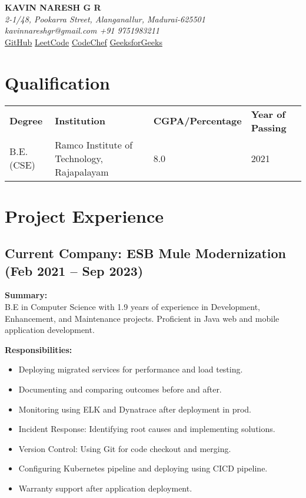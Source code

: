 \documentclass[letterpaper,10pt]{article}
\begin{document}
\pagestyle{empty} %

\begin{center}
\textbf{\LARGE KAVIN NARESH G R} \\
\textit{2-1/48, Pookarra Street, Alanganallur, Madurai-625501} \\
\textit{kavinnareshgr@gmail.com \quad +91 9751983211} \\
\href{https://github.com/kavin-naresh}{GitHub} \quad \href{https://leetcode.com/kavinnareshgr/}{LeetCode} \quad \href{https://www.codechef.com/users/kavinnaresh/}{CodeChef} \quad \href{https://auth.geeksforgeeks.org/user/kavinnan6sj}{GeeksforGeeks}
\end{center}

\section*{Qualification}
\begin{tabular}{l l l l}
\textbf{Degree} & \textbf{Institution} & \textbf{CGPA/Percentage} & \textbf{Year of Passing} \\
B.E.(CSE) & Ramco Institute of Technology, Rajapalayam & 8.0 & 2021 \\
\end{tabular}

\section*{Project Experience}

\subsection*{Current Company: ESB Mule Modernization (Feb 2021 -- Sep 2023)}
\textbf{Summary:} \\
B.E in Computer Science with 1.9 years of experience in Development, Enhancement, and Maintenance projects. Proficient in Java web and mobile application development.

\textbf{Responsibilities:}
\begin{itemize}[left=0pt, label={}]
    \item Deploying migrated services for performance and load testing.
    \item Documenting and comparing outcomes before and after.
    \item Monitoring using ELK and Dynatrace after deployment in prod.
    \item Incident Response: Identifying root causes and implementing solutions.
    \item Version Control: Using Git for code checkout and merging.
    \item Configuring Kubernetes pipeline and deploying using CICD pipeline.
    \item Warranty support after application deployment.
\end{itemize}
\end{document}
